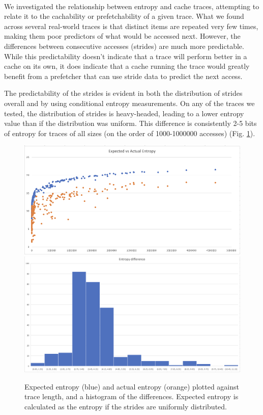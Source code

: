 \documentclass{article}
\begin{document}
\paragraph{}
We investigated the relationship between entropy and cache traces, attempting to relate it to the cachability or prefetchability of a given trace.  What we found across several real-world traces is that distinct items are repeated very few times, making them poor predictors of what would be accessed next.  However, the differences between consecutive accesses (strides) are much more predictable.  While this predictability doesn't indicate that a trace will perform better in a cache on its own, it does indicate that a cache running the trace would greatly benefit from a prefetcher that can use stride data to predict the next access.

The predictability of the strides is evident in both the distribution of strides overall and by using conditional entropy measurements.  On any of the traces we tested, the distribution of strides is heavy-headed, leading to a lower entropy value than if the distribution was uniform.  This difference is consistently 2-5 bits of entropy for traces of all sizes (on the order of 1000-1000000 accesses) (Fig. \ref{fig:expected}).

\begin{figure}[ht]
    \centering
    \includegraphics{expected entropy.png}
    \includegraphics[scale=0.8]{entropy diff.png}
    \caption{Expected entropy (blue) and actual entropy (orange) plotted against trace length, and a histogram of the differences.  Expected entropy is calculated as the entropy if the strides are uniformly distributed.}
    \label{fig:expected}
\end{figure}
\newpage
\end{document}
